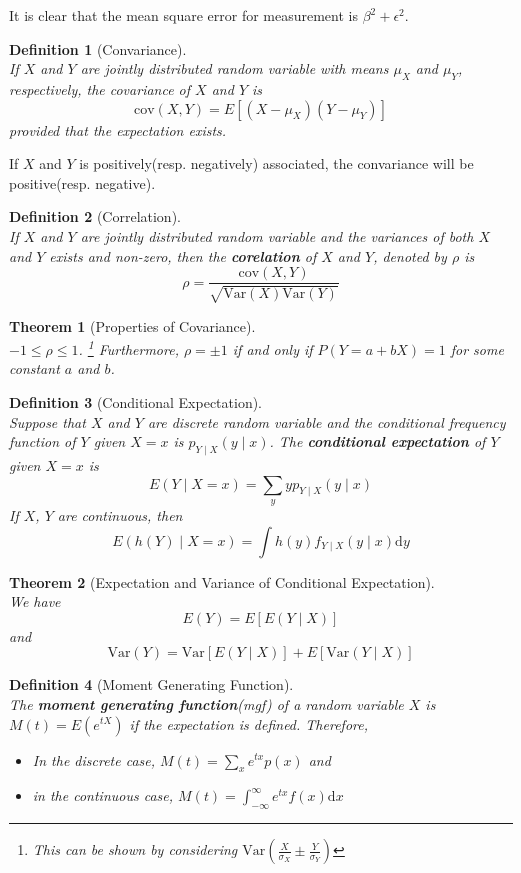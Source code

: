 \documentclass[12pt]{article}
\newcommand{\diff}{\mathrm{d}}
\newcommand{\var}{\mathrm{Var}}
\newcommand{\cov}{\mathrm{cov}}
\newtheorem{definition}{Definition}[section]
\newtheorem{theorem}{Theorem}[section]
\theoremstyle{definition}
\begin{document}
It is clear that the mean square error for measurement is $\beta^2+\epsilon^2$.
\begin{definition}[Convariance]
\hfill\\\normalfont If $X$ and $Y$ are jointly distributed random variable with means $\mu_X$ and $\mu_Y$, respectively, the covariance of $X$ and $Y$ is
\[
\cov(X,Y) = E[(X-\mu_X)(Y-\mu_Y)]
\]
provided that the expectation exists.
\end{definition}
If $X$ and $Y$ is positively(resp. negatively) associated, the convariance will be positive(resp. negative).
\begin{definition}[Correlation]
\hfill\\\normalfont If $X$ and $Y$ are jointly distributed random variable and the variances of both $X$ and $Y$ exists and non-zero, then the \textbf{corelation} of $X$ and $Y$, denoted by $\rho$  is
\[
\rho = \frac{\cov(X,Y)}{\sqrt{\var(X)\var(Y)}}
\]
\end{definition}
\begin{theorem}[Properties of Covariance]
\hfill\\\normalfont $-1\leq \rho\leq 1$. \footnote{This can be shown by considering $\var(\frac{X}{\sigma_X}\pm \frac{Y}{\sigma_Y})$} Furthermore, $\rho = \pm 1$ if and only if $P(Y=a+bX)=1$ for some constant $a$ and $b$.
\end{theorem}
\begin{definition}[Conditional Expectation]
\hfill\\\normalfont Suppose that $X$ and $Y$ are discrete random variable and the conditional frequency function of $Y$ given $X=x$ is $p_{Y\mid X}(y\mid x)$. The \textbf{conditional expectation} of $Y$ given $X=x$ is
\[
E(Y\mid X=x) = \sum_y y p_{Y\mid X}(y\mid x)
\]
If $X$, $Y$ are continuous, then
\[
E(h(Y)\mid X=x) = \int h(y) f_{Y\mid X}(y\mid x)\diff y
\]
\end{definition}
\begin{theorem}[Expectation and Variance of Conditional Expectation]
\hfill\\\normalfont We have
\[
E(Y) = E[E(Y\mid X)]
\]
and
\[
\var(Y) = \var[E(Y\mid X)] + E[\var(Y\mid X)]
\]
\end{theorem}
\begin{definition}[Moment Generating Function]
\hfill\\\normalfont The \textbf{moment generating function}(mgf) of a random variable $X$ is $M(t) = E(e^{tX})$ if the expectation is defined. Therefore,
\begin{itemize}
  \item In the discrete case, $M(t) = \sum_x e^{tx}p(x)$ and 
  \item in the continuous case, $M(t) = \int_{-\infty}^\infty e^{tx}f(x)\diff x$
\end{itemize}
\end{definition}
\end{document}
